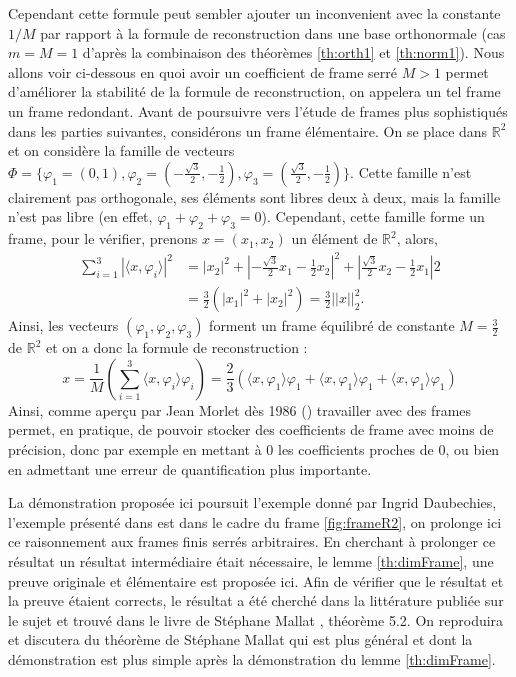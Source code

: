 Cependant cette formule peut sembler ajouter un inconvenient avec la constante $1/M$ par rapport à la formule de reconstruction dans une base orthonormale (cas $m=M=1$ d'après la combinaison des théorèmes \ref{th:orth1} et \ref{th:norm1}). 
Nous allons voir ci-dessous en quoi avoir un coefficient de frame serré $M>1$ permet d'améliorer la stabilité de la formule de reconstruction, on appelera un tel frame un frame redondant.
\newline
Avant de poursuivre vers l'étude de frames plus sophistiqués dans les parties suivantes, considérons un frame élémentaire.
	On se place dans $\mathbb{R}^2$ et on considère la famille de vecteurs $\Phi= \{\varphi_1 = (0, 1), \varphi_2 = (-\frac{\sqrt{3}}{2}, -\frac{1}{2}), \varphi_3 =(\frac{\sqrt{3}}{2}, -\frac{1}{2})\}$.
	Cette famille n'est clairement pas orthogonale, ses éléments sont libres deux à deux, mais la famille n'est pas libre (en effet, $\varphi_1 +\varphi_2 +\varphi_3 = 0$).
	Cependant, cette famille forme un frame, pour le vérifier, prenons $x=(x_1, x_2)$ un élément de $\mathbb{R}^2$, alors,
	\begin{align*}
		\sum_{i=1}^3 |\langle x, \varphi_i \rangle|^2 &= |x_2|^2 + |-\frac{\sqrt{3}}{2}x_1 -\frac{1}{2} x_2|^2 + |\frac{\sqrt{3}}{2}x_2 - \frac{1}{2}x_1|2 \\
		&= \frac{3}{2}(|x_1|^2 + |x_2|^2) = \frac{3}{2} ||x||_2^2.
	\end{align*}
	Ainsi, les vecteurs $(\varphi_1, \varphi_2, \varphi_3)$ forment un frame équilibré de constante $M=\frac{3}{2}$ de $\mathbb{R}^2$ et on a donc la formule de reconstruction :
	\begin{equation}
		x = \frac{1}{M}( \sum_{i=1}^3 \langle x, \varphi_i \rangle \varphi_i) = \frac{2}{3}( \langle x, \varphi_1 \rangle \varphi_1 +  \langle x, \varphi_1 \rangle \varphi_1   + \langle x, \varphi_1 \rangle \varphi_1) 
	\end{equation}
Ainsi, comme aperçu par Jean Morlet dès 1986 (\cite{daubch3}) travailler avec des frames permet, en pratique, de pouvoir stocker des coefficients de frame avec moins de précision, donc par exemple en mettant à 0 les coefficients proches de 0, ou bien en admettant une erreur de quantification plus importante.
\begin{remarque}\label{rq:lemmemallat}
La démonstration proposée ici poursuit l'exemple donné par Ingrid Daubechies, l'exemple présenté dans \cite{daubch3} est dans le cadre du frame \ref{fig:frameR2}, on prolonge ici ce raisonnement aux frames finis serrés arbitraires.
En cherchant à prolonger ce résultat un résultat intermédiaire était nécessaire, le lemme \ref{th:dimFrame}, une preuve originale et élémentaire est proposée ici.
Afin de vérifier que le résultat et la preuve étaient corrects, le résultat a été cherché dans la littérature publiée sur le sujet et trouvé dans le livre de Stéphane Mallat \cite{mallatframe}, théorème 5.2.
On reproduira et discutera du théorème de Stéphane Mallat qui est plus général et dont la démonstration est plus simple après la démonstration du lemme \ref{th:dimFrame}.
\end{remarque}
